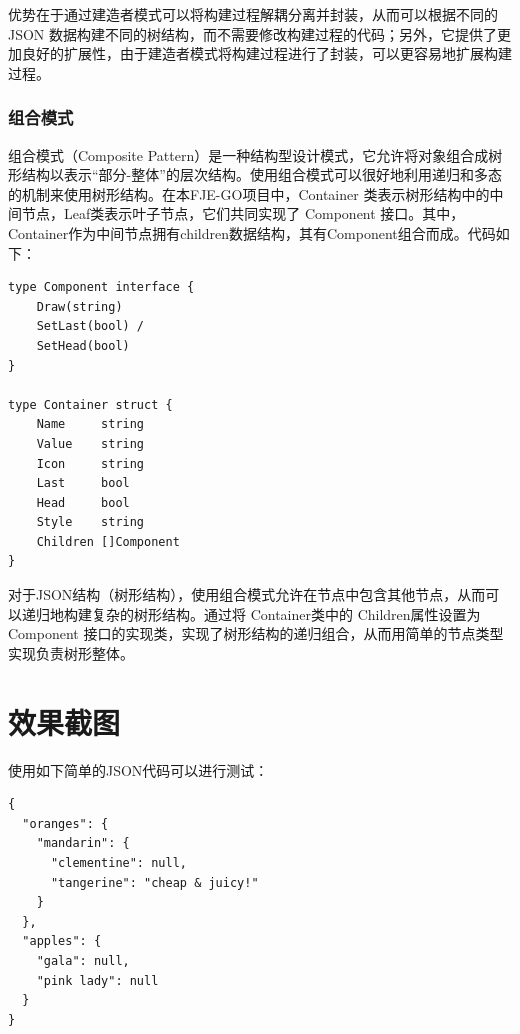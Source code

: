 \documentclass[hyperref,a4paper,UTF8]{ctexart}
\begin{document}
优势在于通过建造者模式可以将构建过程解耦分离并封装，从而可以根据不同的 JSON 数据构建不同的树结构，而不需要修改构建过程的代码；另外，它提供了更加良好的扩展性，由于建造者模式将构建过程进行了封装，可以更容易地扩展构建过程。


\subsubsection{组合模式}
组合模式（Composite Pattern）是一种结构型设计模式，它允许将对象组合成树形结构以表示“部分-整体”的层次结构。使用组合模式可以很好地利用递归和多态的机制来使用树形结构。在本FJE-GO项目中，Container 类表示树形结构中的中间节点，Leaf类表示叶子节点，它们共同实现了 Component 接口。其中，Container作为中间节点拥有children数据结构，其有Component组合而成。代码如下：

\begin{lstlisting}
type Component interface {
	Draw(string)
	SetLast(bool) /
	SetHead(bool)
}

type Container struct {
	Name     string
	Value    string
	Icon     string
	Last     bool 
	Head     bool
	Style    string
	Children []Component
}
\end{lstlisting}

对于JSON结构（树形结构），使用组合模式允许在节点中包含其他节点，从而可以递归地构建复杂的树形结构。通过将 Container类中的 Children属性设置为 Component 接口的实现类，实现了树形结构的递归组合，从而用简单的节点类型实现负责树形整体。































\section{效果截图}

使用如下简单的JSON代码可以进行测试：

\begin{lstlisting}
{
  "oranges": {
    "mandarin": {
      "clementine": null,
      "tangerine": "cheap & juicy!"
    }
  },
  "apples": {
    "gala": null,
    "pink lady": null
  }
}
\end{lstlisting}
\end{document}
